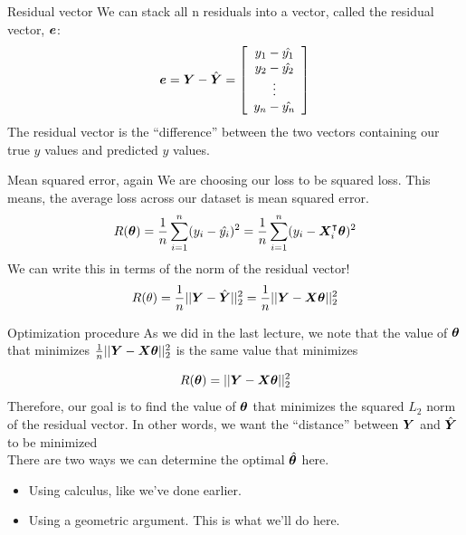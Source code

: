 \documentclass[aspectratio=169]{../latex_main/tntbeamer}  %
\begin{document}
	\begin{frame}{Residual vector}
	    We can stack all n residuals into a vector, called the residual vector, $\bm{e}$:
        \begin{equation*}
            \bm{e} = \bm{Y} - \hat{\bm{Y}}  =\left[\begin{array}{c}
                 y_1 - \hat{y_1}\\
                 y_2 - \hat{y_2}\\
                 \vdots\\
                 y_n - \hat{y_n}\\
            \end{array}\right]
        \end{equation*}
        The residual vector is the “difference” between the two vectors containing our true $y$ values and predicted $y$ values. 

	\end{frame}
	
	
	\begin{frame}{Mean squared error, again}
	    We are choosing our loss to be squared loss. This means, the average loss across our dataset is mean squared error.
        \begin{equation*}
            R(\bm{\theta} ) = \frac{1}{n}\sum_{i=1}^n(y_i - \hat{y_i})^2 = \frac{1}{n}\sum_{i=1}^n(y_i - \bm{X}_i^\intercal\bm{\theta})^2
        \end{equation*}
        We can write this in terms of the norm of the residual vector!
        \begin{equation*}
            R(\theta ) = \frac{1}{n}||\bm{Y} - \hat{\bm{Y}}||_2^2 = \frac{1}{n}||\bm{Y} - \bm{X}\bm{\theta}||_2^2
        \end{equation*}
	\end{frame}
	
	
	
	\begin{frame}{Optimization procedure}
	    As we did in the last lecture, we note that the value of $\bm{\theta}$ that minimizes  $\frac{1}{n}||\bm{Y} - \bm{X}\bm{\theta}||_2^2$                     is the same value that minimizes

        \begin{equation*}
            R(\bm{\theta} ) = ||\bm{Y} - \bm{X}\bm{\theta}||_2^2
        \end{equation*}
        Therefore, our goal is to find the value of     $\bm{\theta}$   that minimizes the squared $L_2$ norm of the residual vector. In other words, we want the “distance” between   $\bm{Y}$   and    $\hat{\bm{Y}}$    to be minimized\\
        \bigskip
        There are two ways we can determine the optimal $\hat{\bm{\theta}}$     here.
        \begin{itemize}
            \item Using calculus, like we’ve done earlier.
            \item Using a geometric argument. This is what we’ll do here.
        \end{itemize}
	\end{frame}
\end{document}

